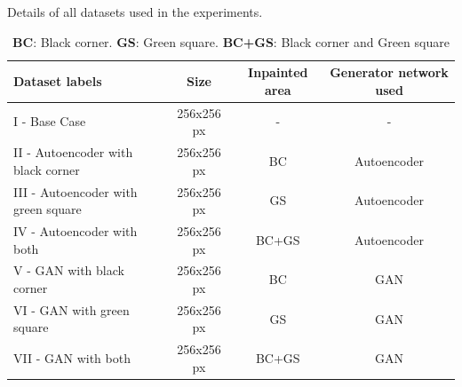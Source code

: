 \begin{table}[h]
\centering
\caption{Details of all datasets used in the experiments.} 
\caption*{\small \textbf{BC}: Black corner. \textbf{GS}: Green square. \textbf{BC+GS}: Black corner and Green square}
\begin{center}
\begin{tabular}{lccc}
\toprule
{Dataset labels} & {Size} & {Inpainted area} & {Generator network used} \\ 
\midrule
I    - Base Case                       & 256x256 px         & -        & -                   \\
II   - Autoencoder with black corner   & 256x256 px         & BC       & Autoencoder         \\
III  - Autoencoder with green square   & 256x256 px         & GS       & Autoencoder         \\
IV   - Autoencoder with both           & 256x256 px         & BC+GS    & Autoencoder         \\
V    - GAN with black corner           & 256x256 px         & BC       & GAN                 \\
VI   - GAN with green square   		   & 256x256 px         & GS       & GAN                 \\
VII  - GAN with both                   & 256x256 px         & BC+GS    & GAN                 \\
\bottomrule
\end{tabular}%
\end{center}
\label{tab:datasets}
\end{table}


